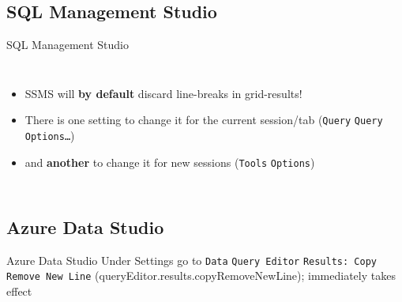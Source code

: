 \documentclass[english,aspectratio=169,handout]{beamer}
\begin{document}
\subsection[SSMS]{SQL Management Studio}
\begin{frame}{SQL Management Studio}
\begin{columns}
        \begin{itemize}
        \item<1| only@1> SSMS will \textbf{by default} discard line-breaks in grid-results!
        \item<2-> There is one setting to change it for the current session/tab (\texttt{Query} \textrightarrow{} \texttt{Query Options…})
        \item<3-> and \textbf{another} to change it for new sessions (\texttt{Tools} \textrightarrow{} \texttt{Options})
        \end{itemize}
        \begin{center}
        \end{center}
    \end{columns}
\end{frame}

\subsection[ADS]{Azure Data Studio}
\begin{frame}{Azure Data Studio}
    Under Settings go to \texttt{Data} \textrightarrow{} \texttt{Query Editor} \textrightarrow{} \texttt{Results: Copy Remove New Line} (queryEditor.results.copyRemoveNewLine); immediately takes effect

    \begin{center}
    \end{center}
\end{frame}
\end{document}
